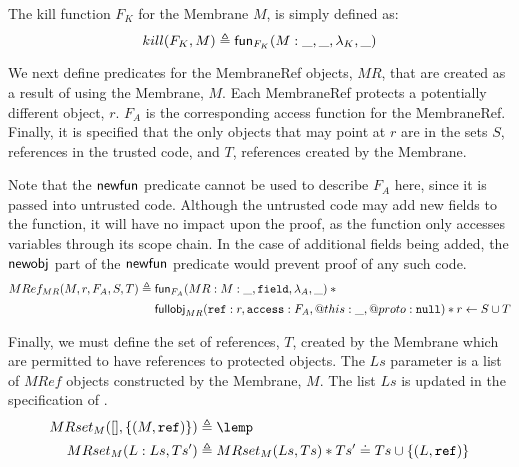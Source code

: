 \documentclass[a4paper,notitlepage]{report}
\begin{document}
The kill function $F_K$ for the Membrane $M$, is simply defined as:
\[ kill(F_K, M) \triangleq \mathsf{fun}_{F_K}(M:\_, \_ , \lambda_K, \_) \]

We next define predicates for the MembraneRef objects, $MR$, that are created as
a result of using the Membrane, $M$. Each MembraneRef protects a potentially
different object, $r$. $F_A$ is the corresponding access function for the
MembraneRef. Finally, it is specified that the only objects that may point at
$r$ are in the sets $S$, references in the trusted code, and $T$, references
created by the Membrane.

Note that the $\mathsf{newfun}$ predicate cannot be used to describe $F_A$ here, since
it is passed into untrusted code. Although the untrusted code may add new fields
to the function, it will have no impact upon the proof, as the function only
accesses variables through its scope chain. In the case of additional fields
being added, the $\mathsf{newobj}$ part of the $\mathsf{newfun}$ predicate would prevent proof
of any such code.
\begin{align*}
  MRef_{MR}(M,r,F_A,S,T) &\triangleq \fun_{F_A}(MR:M:\_, \js{field}, \lambda_A, \_) \sep {} \\
         &\phantom{{} \triangleq {}} \fullobj_{MR}(\js{ref}: r, \js{access}: F_A, @this: \_, @proto: \nil) \sep
    r \bp S \cup T
\end{align*}

Finally, we must define the set of references, $T$, created by the Membrane
which are permitted to have references to protected objects. The $Ls$ parameter
is a list of $MRef$ objects constructed by the Membrane, $M$. The list $Ls$ is
updated in the specification of .
\begin{align*}
  MRset_M([], \{(M, \js{ref})\}) &\triangleq \lemp \\
  MRset_M(L:Ls, Ts') &\triangleq MRset_M(Ls, Ts) \sep Ts' \doteq Ts \cup \{(L, \js{ref})\}
\end{align*}
\end{document}
